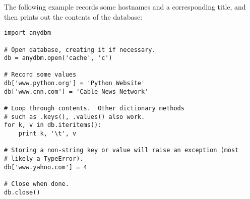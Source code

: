 The following example records some hostnames and a corresponding title, 
and then prints out the contents of the database:

\begin{verbatim}
import anydbm

# Open database, creating it if necessary.
db = anydbm.open('cache', 'c')

# Record some values
db['www.python.org'] = 'Python Website'
db['www.cnn.com'] = 'Cable News Network'

# Loop through contents.  Other dictionary methods
# such as .keys(), .values() also work.
for k, v in db.iteritems():
    print k, '\t', v

# Storing a non-string key or value will raise an exception (most
# likely a TypeError).
db['www.yahoo.com'] = 4

# Close when done.
db.close()
\end{verbatim}


\begin{seealso}
\end{seealso}
